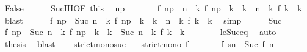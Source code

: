\begin{isabellebody}
\ False\isanewline
\ \ \ \ \isamarkupfalse%
\ Suc{\isachardot}IH{\isacharbrackleft}OF\ this{\isacharbrackright}\ \isamarkupfalse%
\ n\isactrlsub p\isanewline
\ \ \ \ \ \ \ {\isacartoucheopen}f\ n\isactrlsub p\ {\isacharless}\ n\ {\isasymand}\ {\isacharparenleft}{\isasymforall}k{\isachardot}\ f\ n\isactrlsub p\ {\isacharless}\ k\ {\isasymand}\ k\ {\isasymle}\ n\ {\isasymlongrightarrow}\ {\isacharparenleft}{\isasymnexists}k\ f\ k\ {\isacharequal}\ k{\isacharparenright}{\isacharparenright}{\isacartoucheclose}\ \isamarkupfalse%
\ blast\isanewline
\ \ \ \ \isamarkupfalse%
\ {\isacartoucheopen}f\ n\isactrlsub p\ {\isacharless}\ Suc\ n\ {\isasymand}\ {\isacharparenleft}{\isasymforall}k{\isachardot}\ f\ n\isactrlsub p\ {\isacharless}\ k\ {\isasymand}\ k\ {\isasymle}\ n\ {\isasymlongrightarrow}\ {\isacharparenleft}{\isasymnexists}k\ f\ k\ {\isacharequal}\ k{\isacharparenright}{\isacharparenright}{\isacartoucheclose}\ \isamarkupfalse%
\ simp\isanewline
\ \ \ \ \isamarkupfalse%
\ Suc{\isacharparenleft}{}{\isacharparenright}\ \isamarkupfalse%
\ {\isacartoucheopen}f\ n\isactrlsub p\ {\isacharless}\ {\isacharparenleft}Suc\ n{\isacharparenright}\ {\isasymand}\ {\isacharparenleft}{\isasymforall}k{\isachardot}\ f\ n\isactrlsub p\ {\isacharless}\ k\ {\isasymand}\ k\ {\isasymle}\ {\isacharparenleft}Suc\ n{\isacharparenright}\ {\isasymlongrightarrow}\ {\isacharparenleft}{\isasymnexists}k\ f\ k\ {\isacharequal}\ k{\isacharparenright}{\isacharparenright}{\isacartoucheclose}\isanewline
\ \ \ \ \ \ \isamarkupfalse%
\ le{\isacharunderscore}Suc{\isacharunderscore}eq\ \isamarkupfalse%
\ auto\isanewline
\ \ \ \ \isamarkupfalse%
\ {\isacharquery}thesis\ \isamarkupfalse%
\ blast\isanewline
\ \ \isamarkupfalse%
\isanewline
{}\isamarkupfalse%
%
\endisatagproof
{\isafoldproof}%
%
\isadelimproof
\isanewline
%
\endisadelimproof
\isanewline
{}\isamarkupfalse%
\ strict{\isacharunderscore}mono{\isacharunderscore}suc{\isacharcolon}\isanewline
\ \ \ {\isacartoucheopen}strict{\isacharunderscore}mono\ f{\isacartoucheclose}\isanewline
\ \ \ \ \ \ \ {\isacartoucheopen}f\ sn\ {\isacharequal}\ Suc\ {\isacharparenleft}f\ n{\isacharparenright}{\isacartoucheclose}\isanewline

\end{isabellebody}

